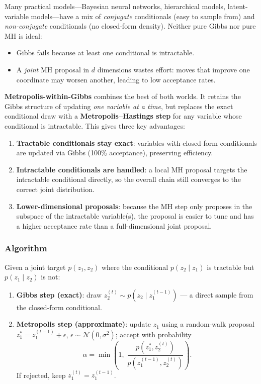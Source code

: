 \documentclass[12pt, a4paper]{article}
\begin{document}
Many practical models---Bayesian neural networks, hierarchical
models, latent-variable models---have a mix of \emph{conjugate}
conditionals (easy to sample from) and \emph{non-conjugate}
conditionals (no closed-form density).  Neither pure Gibbs
nor pure MH is ideal:
\begin{itemize}
    \item Gibbs fails because at least one conditional is
          intractable.
    \item A \emph{joint} MH proposal in $d$ dimensions wastes
          effort: moves that improve one coordinate may worsen
          another, leading to low acceptance rates.
\end{itemize}

\textbf{Metropolis-within-Gibbs} combines the best of both
worlds.  It retains the Gibbs structure of updating
\emph{one variable at a time}, but replaces the exact
conditional draw with a \textbf{Metropolis--Hastings step}
for any variable whose conditional is intractable.
This gives three key advantages:
\begin{enumerate}
    \item \textbf{Tractable conditionals stay exact}: variables
          with closed-form conditionals are updated via Gibbs
          (100\% acceptance), preserving efficiency.
    \item \textbf{Intractable conditionals are handled}: a
          local MH proposal targets the intractable conditional
          directly, so the overall chain still converges to the
          correct joint distribution.
    \item \textbf{Lower-dimensional proposals}: because the MH
          step only proposes in the subspace of the intractable
          variable(s), the proposal is easier to tune and has a
          higher acceptance rate than a full-dimensional joint
          proposal.
\end{enumerate}

\subsubsection{Algorithm}

Given a joint target $p(z_1, z_2)$ where the conditional
$p(z_2 \mid z_1)$ is tractable but $p(z_1 \mid z_2)$ is not:

\begin{enumerate}
    \item \textbf{Gibbs step (exact)}: draw
          $z_2^{(t)} \sim p\!\left(z_2 \mid z_1^{(t-1)}\right)$
          --- a direct sample from the closed-form conditional.
    \item \textbf{Metropolis step (approximate)}: update
          $z_1$ using a random-walk proposal
          $z_1^* = z_1^{(t-1)} + \epsilon$,\;
          $\epsilon \sim \mathcal{N}(0, \sigma^2)$; accept
          with probability
          \[
              \alpha = \min\!\left(1,\;
                  \frac{p(z_1^*, z_2^{(t)})}
                       {p(z_1^{(t-1)}, z_2^{(t)})}\right).
          \]
          If rejected, keep $z_1^{(t)} = z_1^{(t-1)}$.
\end{enumerate}
\end{document}
